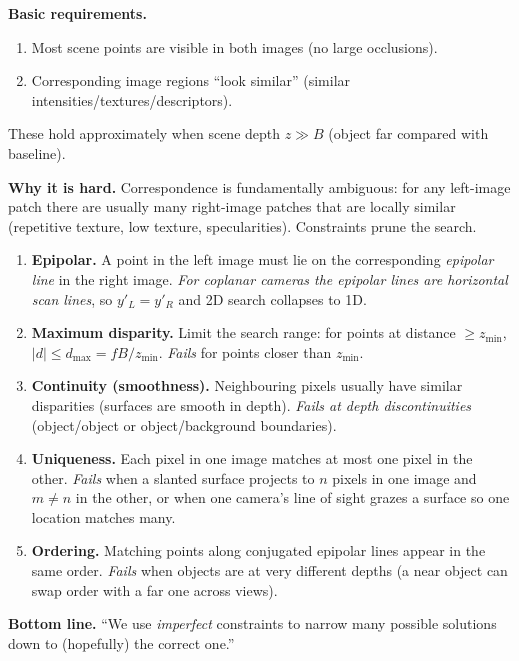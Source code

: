 \separator

\textbf{Basic requirements.}
\begin{enumerate}
  \item Most scene points are visible in both images (no large occlusions).
  \item Corresponding image regions ``look similar'' (similar intensities/textures/descriptors).
\end{enumerate}
These hold approximately when scene depth $z \gg B$ (object far compared with baseline).

\textbf{Why it is hard.} Correspondence is fundamentally ambiguous: for any left-image patch there are usually many right-image patches that are locally similar (repetitive texture, low texture, specularities). Constraints prune the search.

\separator

\begin{thmbox}
\begin{enumerate}
  \item \textbf{Epipolar.} A point in the left image must lie on the corresponding \emph{epipolar line} in the right image. \emph{For coplanar cameras the epipolar lines are horizontal scan lines}, so $y'_L = y'_R$ and 2D search collapses to 1D.
  \item \textbf{Maximum disparity.} Limit the search range: for points at distance $\geq z_{\min}$, $|d| \leq d_{\max} = fB/z_{\min}$. \emph{Fails} for points closer than $z_{\min}$.
  \item \textbf{Continuity (smoothness).} Neighbouring pixels usually have similar disparities (surfaces are smooth in depth). \emph{Fails at depth discontinuities} (object/object or object/background boundaries).
  \item \textbf{Uniqueness.} Each pixel in one image matches at most one pixel in the other. \emph{Fails} when a slanted surface projects to $n$ pixels in one image and $m \neq n$ in the other, or when one camera's line of sight grazes a surface so one location matches many.
  \item \textbf{Ordering.} Matching points along conjugated epipolar lines appear in the same order. \emph{Fails} when objects are at very different depths (a near object can swap order with a far one across views).
\end{enumerate}
\end{thmbox}

\textbf{Bottom line.} ``We use \emph{imperfect} constraints to narrow many possible solutions down to (hopefully) the correct one.''

